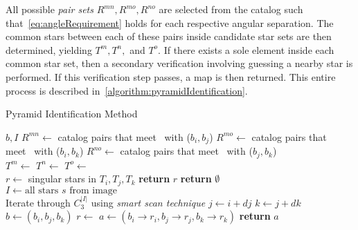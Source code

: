 All possible \textit{pair sets} $R^{mn}, R^{mo}, R^{no}$ are selected from the catalog such
that~\autoref{eq:angleRequirement} holds for each respective angular separation.
The common stars between each of these pairs inside candidate star sets are then determined, yielding $T^m, T^n, $ and
$T^o$.
If there exists a sole element inside each common star set, then a secondary verification involving guessing a nearby
star is performed.
If this verification step passes, a map is then returned.
This entire process is described in~\autoref{algorithm:pyramidIdentification}.

\begin{algorithm}
    \caption{Pyramid Identification Method} \label{algorithm:pyramidIdentification}
    \begin{algorithmic}[1]
         {$b, I$}
        \State $R^{mn} \gets$ catalog pairs that meet~ with ($b_i, b_j$)
        \State $R^{mo} \gets$ catalog pairs that meet~ with ($b_i, b_k$)
        \State $R^{no} \gets$ catalog pairs that meet~ with ($b_j, b_k$)
        \\
        \State $T^m \gets $ 
        \State $T^n \gets $ 
        \State $T^o \gets $ 
        \\
        \State $r \gets $ singular stars in $T_i, T_j, T_k$
        \State \textbf{return} $r$
        \EndIf
        \EndIf
        \State \textbf{return} $\emptyset$
        \EndFunction
        \\
        \State $I \gets \text{all stars } s \text{ from image}$
        \\
        \LineComment Iterate through $C^{|I|}_3$ using \textit{smart scan technique}
        \State $j \gets i + dj$
        \State $k \gets j + dk$
        \\
        \State $b \gets (b_i, b_j, b_k)$
        \State $r \gets$ 
        \State $a \gets (b_i \rightarrow r_i, b_j \rightarrow r_j, b_k \rightarrow r_k)$
        \State \textbf{return} $a$
        \EndIf
        \EndFor
        \EndFor
        \EndFor
        \EndProcedure
    \end{algorithmic}
\end{algorithm}

